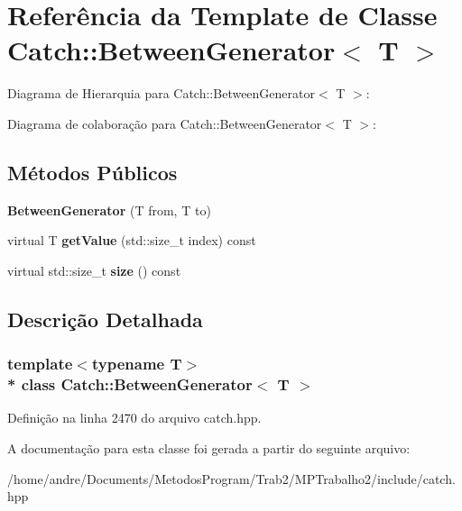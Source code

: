 \hypertarget{classCatch_1_1BetweenGenerator}{}\section{Referência da Template de Classe Catch\+:\+:Between\+Generator$<$ T $>$}
\label{classCatch_1_1BetweenGenerator}


Diagrama de Hierarquia para Catch\+:\+:Between\+Generator$<$ T $>$\+:


Diagrama de colaboração para Catch\+:\+:Between\+Generator$<$ T $>$\+:
\subsection*{Métodos Públicos}
\begin{DoxyCompactItemize}
\item 
{\bfseries Between\+Generator} (T from, T to)\hypertarget{classCatch_1_1BetweenGenerator_a835a057d691ae37caef660624099b51c}{}\label{classCatch_1_1BetweenGenerator_a835a057d691ae37caef660624099b51c}

\item 
virtual T {\bfseries get\+Value} (std\+::size\+\_\+t index) const \hypertarget{classCatch_1_1BetweenGenerator_af83575d62cc727ca995446cff4d6c26c}{}\label{classCatch_1_1BetweenGenerator_af83575d62cc727ca995446cff4d6c26c}

\item 
virtual std\+::size\+\_\+t {\bfseries size} () const \hypertarget{classCatch_1_1BetweenGenerator_aa53a04a259e796ba2b5adabed79474b5}{}\label{classCatch_1_1BetweenGenerator_aa53a04a259e796ba2b5adabed79474b5}

\end{DoxyCompactItemize}


\subsection{Descrição Detalhada}
\subsubsection*{template$<$typename T$>$\\*
class Catch\+::\+Between\+Generator$<$ T $>$}



Definição na linha 2470 do arquivo catch.\+hpp.



A documentação para esta classe foi gerada a partir do seguinte arquivo\+:\begin{DoxyCompactItemize}
\item 
/home/andre/\+Documents/\+Metodos\+Program/\+Trab2/\+M\+P\+Trabalho2/include/catch.\+hpp\end{DoxyCompactItemize}
